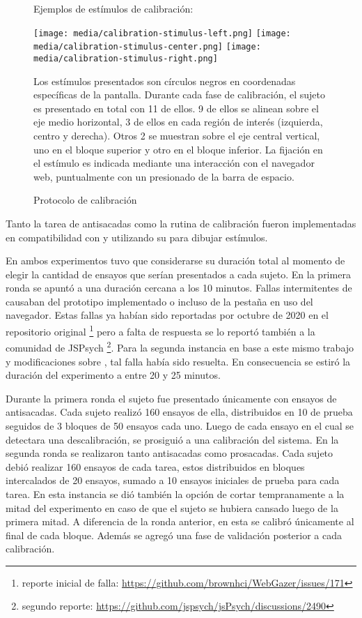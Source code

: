   \begin{figure}
    \centering

    Ejemplos de estímulos de calibración:

    \texttt{[image: media/calibration-stimulus-left.png]}
    \texttt{[image: media/calibration-stimulus-center.png]}
    \texttt{[image: media/calibration-stimulus-right.png]}

    Los estímulos presentados son círculos negros en coordenadas específicas de
    la pantalla.
    Durante cada fase de calibración, el sujeto es presentado en total con 11
    de ellos.
    9 de ellos se alinean sobre el eje medio horizontal, 3 de ellos en cada
    región de interés (izquierda, centro y derecha).
    Otros 2 se muestran sobre el eje central vertical, uno en el bloque
    superior y otro en el bloque inferior.
    La fijación en el estímulo es indicada mediante una interacción con el
    navegador web, puntualmente con un presionado de la barra de espacio.

    \caption{Protocolo de calibración}
    \label{fig:calibration-protocol}
  \end{figure}

  Tanto la tarea de antisacadas como la rutina de calibración fueron
  implementadas en compatibilidad con \jspsych y utilizando su \plugin
  \psychophysics para dibujar estímulos.

  En ambos experimentos tuvo que considerarse su duración total al momento de 
  elegir la cantidad de ensayos que serían presentados a cada sujeto.
  En la primera ronda se apuntó a una duración cercana a los 10 minutos.
  Fallas intermitentes de \webgazer causaban \crashes del prototipo implementado
  o incluso de la pestaña en uso del navegador.
  Estas fallas ya habían sido reportadas por octubre de 2020 en el repositorio
  original \footnote{reporte inicial de falla:
  \url{https://github.com/brownhci/WebGazer/issues/171}} pero a falta de
  respuesta se lo reportó también a la comunidad de JSPsych \footnote{segundo
  reporte: \url{https://github.com/jspsych/jsPsych/discussions/2490}}.
  Para la segunda instancia en base a este mismo trabajo y modificaciones sobre
  \webgazer, tal falla había sido resuelta.
  En consecuencia se estiró la duración del experimento a entre 20 y 25 minutos.

  Durante la primera ronda el sujeto fue presentado únicamente con ensayos de
  antisacadas.
  Cada sujeto realizó 160 ensayos de ella, distribuidos en 10 de prueba seguidos
  de 3 bloques de 50 ensayos cada uno.
  Luego de cada ensayo en el cual se detectara una descalibración, se prosiguió
  a una calibración del sistema.
  En la segunda ronda se realizaron tanto antisacadas como prosacadas.
  Cada sujeto debió realizar 160 ensayos de cada tarea, estos distribuidos en
  bloques intercalados de 20 ensayos, sumado a 10 ensayos iniciales de prueba
  para cada tarea.
  En esta instancia se dió también la opción de cortar tempranamente a la mitad
  del experimento en caso de que el sujeto se hubiera cansado luego de la primera
  mitad.
  A diferencia de la ronda anterior, en esta se calibró únicamente al final de
  cada bloque.
  Además se agregó una fase de validación posterior a cada calibración.

